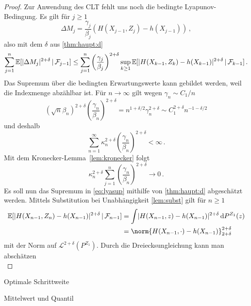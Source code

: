 \documentclass[ngerman,a4paper,11pt]{scrartcl}
\newcommand{\EE}{\mathbb{E}}
\newcommand{\ff}{\mathcal{F}}
\renewcommand{\ll}{\mathcal{L}}
\newcommand{\condexp}[2]{\EE[#1\,|\,#2]}
\newcommand{\dvar}[1]{\,\mathrm{d}#1}
\DeclarePairedDelimiter{\abs}{\lvert}{\rvert}		%
\begin{document}
\begin{proof}
Zur Anwendung des CLT fehlt uns noch die bedingte Lyapunov-Bedingung. Es gilt
für $j\geq 1$
\begin{equation*}
 \Delta M_j=\frac{\gamma_j}{\beta_j}(H(X_{j-1},Z_j)-h(X_{j-1}))\,,
\end{equation*}
also mit dem $\delta$ aus \cref{thm:haupt:d}
\begin{equation}\label{eq:lyasup}
 \sum_{j=1}^n\condexp{\abs{\Delta M_j}^{2+\delta}}{\ff_{j-1}}\leq\sum_{j=1}^n\left( \frac{\gamma_j}{\beta_j} \right)^{2+\delta}\sup_{k\geq 1}\condexp{\abs{H(X_{k-1}, Z_k)-h(X_{k-1})}^{2+\delta}}{\ff_{k-1}}\,.
\end{equation}
Das Supremum über die bedingten Erwartungswerte kann gebildet werden, weil die
Indexmenge abzählbar ist. Für $n\to\infty$ gilt wegen $\gamma_n\sim C_1/n$
\begin{equation*}
 (\sqrt{n}\beta_n)^{2+\delta} \left( \frac{\gamma_n}{\beta_n} \right)^{2+\delta}=n^{1+\delta/2}\gamma_n^{2+\delta}\sim C_1^{2+\delta}n^{-1-\delta/2}
\end{equation*}
und deshalb
\begin{equation*}
 \sum_{n=1}^\infty \kappa_n^{2+\delta}\left( \frac{\gamma_n}{\beta_n} \right)^{2+\delta}<\infty\,.
\end{equation*}
Mit dem Kronecker-Lemma~\ref{lem:kronecker} folgt
\begin{equation*}
 \kappa_n^{2+\delta} \sum_{j=1}^n\left( \frac{\gamma_n}{\beta_n} \right)^{2+\delta}\to 0\,.
\end{equation*}
Es soll nun das Supremum in \cref{eq:lyasup} mithilfe von \cref{thm:haupt:d} abgeschätzt werden.
Mittels Substitution bei Unabhängigkeit \ref{lem:subst} gilt für $n\geq 1$
\begin{align*}
  \condexp{\abs{H(X_{n-1},Z_n)-h(X_{n-1})}^{2+\delta}}{\ff_{n-1}}&=\int\abs{H(X_{n-1},z)-h(X_{n-1})}^{2+\delta}\dvar{P^{Z_1}(z)} \\
&=\norm{H(X_{n-1},\cdot)-h(X_{n-1})}_{2+\delta}^{2+\delta}
\end{align*}
 mit der Norm auf $\ll^{2+\delta}(P^{Z_1})$. Durch die Dreiecksungleichung kann
 man abschätzen
 \begin{equation*}
   
 \end{equation*}
\end{proof}
\begin{rem}
 Optimale Schrittweite 
\end{rem}
\begin{exmp}
 Mittelwert und Quantil 
\end{exmp}
\printbibliography
\end{document}
